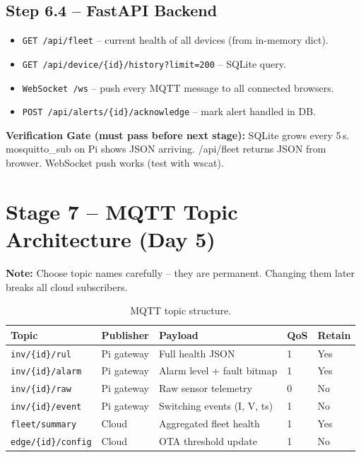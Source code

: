 \documentclass[12pt,a4paper]{article}
\newenvironment{notebox}{%
  \begin{mdframed}[backgroundcolor=notebg,linecolor=noteln,linewidth=1.5pt,
    innerleftmargin=9pt,innerrightmargin=9pt,innertopmargin=5pt,innerbottommargin=5pt]
  \textbf{\color{noteln}Note: }}{\end{mdframed}}
\newenvironment{checkgate}{%
  \begin{mdframed}[backgroundcolor=yellow!10,linecolor=orange!70,linewidth=1.5pt,
    innerleftmargin=9pt,innerrightmargin=9pt,innertopmargin=5pt,innerbottommargin=5pt]
  \textbf{\color{orange!70!black}Verification Gate (must pass before next stage): }}{\end{mdframed}}
\begin{document}
\subsection{Step 6.4 -- FastAPI Backend}

\begin{itemize}[noitemsep]
  \item \texttt{GET /api/fleet} -- current health of all devices (from in-memory dict).
  \item \texttt{GET /api/device/\{id\}/history?limit=200} -- SQLite query.
  \item \texttt{WebSocket /ws} -- push every MQTT message to all connected browsers.
  \item \texttt{POST /api/alerts/\{id\}/acknowledge} -- mark alert handled in DB.
\end{itemize}

\begin{checkgate}
SQLite grows every 5\,s. mosquitto\_sub on Pi shows JSON arriving. /api/fleet returns JSON from browser.
WebSocket push works (test with wscat).
\end{checkgate}

\section{Stage 7 -- MQTT Topic Architecture (Day 5)}

\begin{notebox}
Choose topic names carefully -- they are permanent. Changing them later breaks all cloud subscribers.
\end{notebox}

\begin{table}[H]
\centering
\begin{tabularx}{\textwidth}{lllll}
\toprule
\textbf{Topic} & \textbf{Publisher} & \textbf{Payload} & \textbf{QoS} & \textbf{Retain} \\
\midrule
\texttt{inv/\{id\}/rul}     & Pi gateway & Full health JSON  & 1 & Yes \\
\texttt{inv/\{id\}/alarm}   & Pi gateway & Alarm level + fault bitmap & 1 & Yes \\
\texttt{inv/\{id\}/raw}     & Pi gateway & Raw sensor telemetry & 0 & No \\
\texttt{inv/\{id\}/event}   & Pi gateway & Switching events (I, V, ts) & 1 & No \\
\texttt{fleet/summary}      & Cloud      & Aggregated fleet health & 1 & Yes \\
\texttt{edge/\{id\}/config} & Cloud      & OTA threshold update & 1 & No \\
\bottomrule
\end{tabularx}
\caption{MQTT topic structure.}
\end{table}
\end{document}
